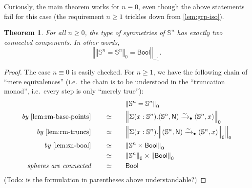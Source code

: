 \documentclass[11pt,a4paper,oneside,reqno]{amsart}
\newtheorem{theorem}{Theorem}
\theoremstyle{definition}
\theoremstyle{remark}
\newcommand{\sph}[1]{{\mathbb S}^{#1}}
\newcommand{\trunc}[2]{\mathopen{}\left\Vert #2\right\Vert_{#1}\mathclose{}}
\newcommand{\North}{\mathsf N}
\begin{document}
Curiously, the main theorem works for $n \equiv 0$, even though the above statements fail for this case (the requirement $n \geq 1$ trickles down from \cref{lem:grp-iso}).
\begin{theorem}
 For all $n \geq 0$, the type of symmetries of $\sph n$ has exactly two connected components.
 In other words,
 \begin{equation}
  \trunc {-1} {\trunc 0 {\sph n = \sph n} = \mathsf{Bool}}.
 \end{equation}
\end{theorem}
\begin{proof}
 The case $n \equiv 0$ is easily checked.
 For $n \geq 1$, we have the following chain of ``mere equivalences'' (i.e.\ the chain is to be understood in the ``truncation monad'', i.e.\ every step is only ``merely true''):
  \begin{alignat}{5}
  &&&\trunc 0 {\sph n = \sph n} \\
  \textit{by }\cref{lem:rm-base-points} \qquad &\simeq &\quad& \trunc 0 {\Sigma(x : \sph n).(\sph n, \North) \xrightarrow{\sim}_\bullet (\sph n, x)}  \\
  \textit{by }\cref{lem:rm-truncs} \qquad &\simeq && \trunc 0 {\Sigma(x : \sph n).\trunc 0 {(\sph n, \North) \xrightarrow{\sim}_\bullet (\sph n, x)}}  \\
  \textit{by }\cref{lem:sn-bool} \qquad &\simeq && \trunc 0 {\sph n \times \mathsf{Bool}}  \\
  \textit{ } \qquad &\simeq && \trunc 0 {\sph n} \times \trunc 0 {\mathsf{Bool}}    \\
  \textit{spheres are connected} \qquad &\simeq && \mathsf{Bool}
 \end{alignat}
(Todo: is the formulation in parentheses above understandable?)
\end{proof}

% 
% 




\end{document}
